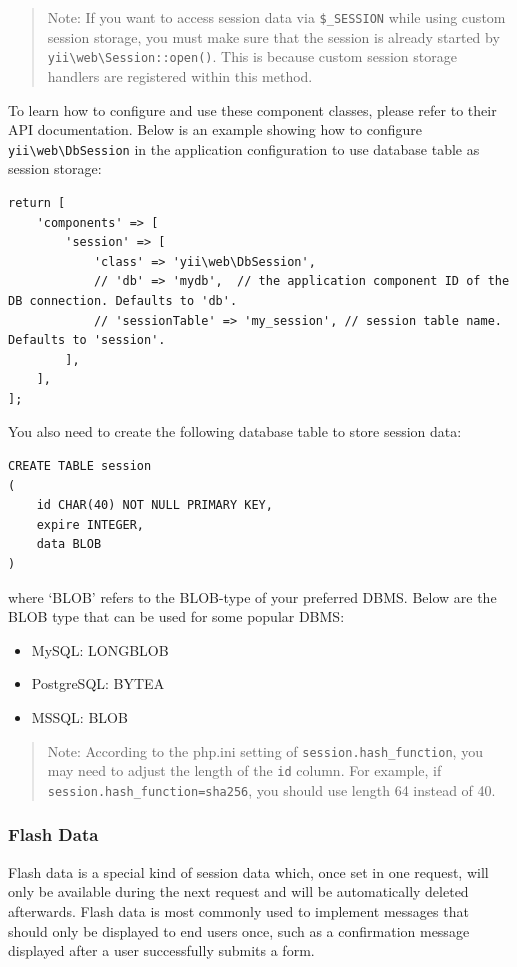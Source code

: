 \begin{quote}Note: If you want to access session data via \lstinline|$_SESSION| while using custom session storage, you must make
  sure that the session is already started by \texttt{yii{\allowbreak{}\textbackslash}web{\allowbreak{}\textbackslash}Session\allowbreak{}::\allowbreak{}open()}. This is because custom session storage
  handlers are registered within this method.

\end{quote}
To learn how to configure and use these component classes, please refer to their API documentation. Below is
an example showing how to configure \texttt{yii{\allowbreak{}\textbackslash}web{\allowbreak{}\textbackslash}DbSession} in the application configuration to use database table
as session storage:

\lstset{language=php}\begin{lstlisting}
return [
    'components' => [
        'session' => [
            'class' => 'yii\web\DbSession',
            // 'db' => 'mydb',  // the application component ID of the DB connection. Defaults to 'db'.
            // 'sessionTable' => 'my_session', // session table name. Defaults to 'session'.
        ],
    ],
];
\end{lstlisting}
You also need to create the following database table to store session data:

\lstset{language=sql}\begin{lstlisting}
CREATE TABLE session
(
    id CHAR(40) NOT NULL PRIMARY KEY,
    expire INTEGER,
    data BLOB
)
\end{lstlisting}
where `BLOB' refers to the BLOB-type of your preferred DBMS. Below are the BLOB type that can be used for some popular DBMS:

\begin{itemize}
\item MySQL: LONGBLOB
\item PostgreSQL: BYTEA
\item MSSQL: BLOB
\end{itemize}
\begin{quote}Note: According to the php.ini setting of \lstinline|session.hash_function|, you may need to adjust
  the length of the \lstinline|id| column. For example, if \lstinline|session.hash_function=sha256|, you should use
  length 64 instead of 40.

\end{quote}
\subsubsection{Flash Data \label{runtime-sessions-cookies.md::flash-data}}
Flash data is a special kind of session data which, once set in one request, will only be available during
the next request and will be automatically deleted afterwards. Flash data is most commonly used to implement
messages that should only be displayed to end users once, such as a confirmation message displayed after
a user successfully submits a form.

